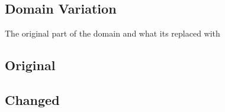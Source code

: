 \begin{appendices}
\lstset{tabsize=2}

\section{Domain Variation}\label{Domain_Variation}
The original part of the domain and what its replaced with
\subsection{Original}\label{domain}

\subsection{Changed}\label{domain2}


\end{appendices}